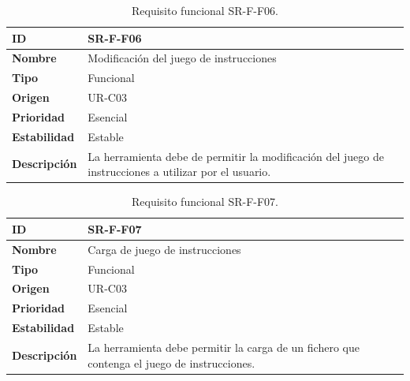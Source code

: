 \begin{center}
\begin{table}[htbp]
\centering
\caption{Requisito funcional SR-F-F06.}
\begin{tabular}{@{}p{2.5cm} p{9cm}@{}} 
\toprule
\textbf{ID} 				& SR-F-F06 \\
\midrule
\textbf{Nombre} 			& Modificación del juego de instrucciones\\
\midrule
\textbf{Tipo} 			& Funcional \\
\midrule
\textbf{Origen} 			& UR-C03 \\
\midrule
\textbf{Prioridad}		& Esencial \\
\midrule
\textbf{Estabilidad} 		& Estable \\
\midrule
\textbf{Descripción} 	& La herramienta debe de permitir la modificación del juego de instrucciones a utilizar por el usuario. \\
\bottomrule
\end{tabular}
\label{tab:srff06}
\end{table}
\end{center}

\begin{center}
\begin{table}[htbp]
\centering
\caption{Requisito funcional SR-F-F07.}
\begin{tabular}{@{}p{2.5cm} p{9cm}@{}} 
\toprule
\textbf{ID} 				& SR-F-F07 \\
\midrule
\textbf{Nombre} 			& Carga de juego de instrucciones\\
\midrule
\textbf{Tipo} 			& Funcional \\
\midrule
\textbf{Origen} 			& UR-C03 \\
\midrule
\textbf{Prioridad}		& Esencial \\
\midrule
\textbf{Estabilidad} 		& Estable \\
\midrule
\textbf{Descripción} 	& La herramienta debe permitir la carga de un fichero que contenga el juego de instrucciones. \\
\bottomrule
\end{tabular}
\label{tab:srff07}
\end{table}
\end{center}

